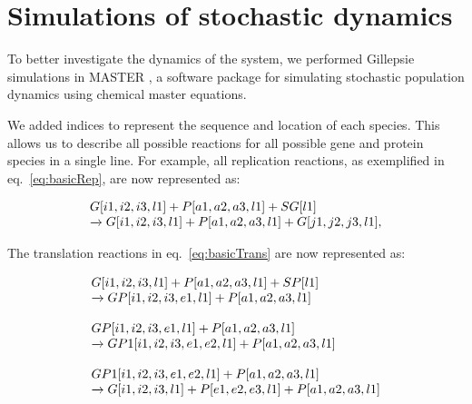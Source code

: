 \documentclass{article}
\begin{document}
\section{Simulations of stochastic dynamics}

To better investigate the dynamics of the system, we performed Gillepsie simulations in MASTER \citep{MASTER}, a software package for simulating stochastic population dynamics using chemical master equations. 

We added indices to represent the sequence and location of each species.  This allows us to describe all possible reactions for all possible gene and protein species in a single line.  
For example, all replication reactions, as exemplified in eq.~\ref{eq:basicRep}, are now represented as:

\begin{equation}
 \begin{array}{l l}
 G[i1,i2,i3,l1] + P[a1,a2,a3,l1] + SG[l1]\\
 
\xrightarrow[]{} G[i1,i2,i3,l1] + P[a1,a2,a3,l1] + G[j1,j2,j3,l1],\\
\end{array}
\label{eq:masterRep}
\end{equation}

The translation reactions in eq.~\ref{eq:basicTrans} are now represented as:

\begin{equation}
 \begin{array}{l l}
G[i1,i2,i3,l1] + P[a1,a2,a3,l1] + SP[l1] \\

\xrightarrow[]{} GP[i1,i2,i3,e1,l1] + P[a1,a2,a3,l1] \\
\\
GP[i1,i2,i3,e1,l1] + P[a1,a2,a3,l1] \\

\xrightarrow[]{} GP1[i1,i2,i3,e1,e2,l1] + P[a1,a2,a3,l1] \\
\\
GP1[i1,i2,i3,e1,e2,l1] + P[a1,a2,a3,l1] \\

\xrightarrow[]{} G[i1,i2,i3,l1] + P[e1,e2,e3,l1] + P[a1,a2,a3,l1] \\
\end{array}
\label{eq:masterTrans}
\end{equation}
\end{document}
